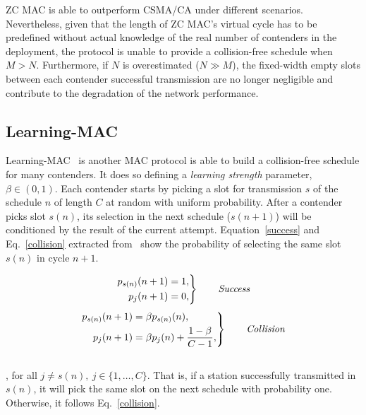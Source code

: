 \documentclass[a4paper,journal]{IEEEtran}
\begin{document}
ZC MAC is able to outperform CSMA/CA under different scenarios. Nevertheless, given that the length of ZC MAC's virtual cycle has to be predefined without actual knowledge of the real number of contenders in the deployment, the protocol is unable to provide a collision-free schedule when $M>N$. Furthermore, if $N$ is overestimated ($N\gg M$), the fixed-width empty slots between each contender successful transmission are no longer negligible and contribute to the degradation of the network performance.


\subsection{Learning-MAC}

Learning-MAC~\cite{L_MAC} is another MAC protocol is able to build a collision-free schedule for many contenders. It does so defining a \emph{learning strength} parameter, $\beta\in(0,1)$. Each contender starts by picking a slot for transmission $s$ of the schedule $n$ of length $C$ at random with uniform probability. After a contender picks slot $s(n)$, its selection in the next schedule ($s(n+1)$) will be conditioned by the result of the current attempt. Equation~\ref{success} and Eq.~\ref{collision} extracted from~\cite{L_MAC} show the probability of selecting the same slot $s(n)$ in cycle $n+1$.

\begin{equation} \label{success}
		\left. \begin{aligned}
			p_{s(n)}(n+1)&=1,\\
			p_{j}(n+1)&=0,
		\end{aligned}
	\right\}
	\qquad \text{\emph{Success}}
\end{equation}
\begin{equation} \label{collision}
	\left. \begin{aligned}
			p_{s(n)}(n+1)&=\beta p_{s(n)}(n),\\
			p_{j}(n+1)&=\beta p_{j}(n)+\frac{1-\beta}{C -1},
		\end{aligned}
	\right\}
	\qquad \text{\emph{Collision}}
\end{equation}
\\
, for all $j\neq s(n),~j\in \{1,\dots ,C\}$. That is, if a station successfully transmitted in $s(n)$, it will pick the same slot on the next schedule with probability one. Otherwise, it follows Eq.~\ref{collision}.
\end{document}
